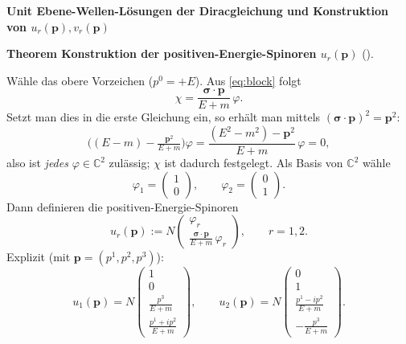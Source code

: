 \documentclass[10pt, letterpaper]{article}
\newcommand{\C}{\mathbb{C}}
\newcommand{\CustomHeading}[3]{%
  \par\medskip\noindent%
  \textbf{#1 #2} \textnormal{(#3)}.\enskip%
}
\newenvironment{THEO}[2]{\begin{unitbox}\CustomHeading{Theorem}{#1}{#2}}{\end{unitbox}}
\newenvironment{unit}[1]
  {\begin{unitbox}\textbf{Unit #1}\par\smallskip}
  {\end{unitbox}}
\begin{document}
\begin{unit}{Ebene-Wellen-Lösungen der Diracgleichung und Konstruktion von $u_r(\mathbf p),v_r(\mathbf p)$}
\begin{THEO}{Konstruktion der positiven-Energie-Spinoren $u_r(\mathbf p)$}{}
Wähle das obere Vorzeichen ($p^0=+E$). Aus \eqref{eq:block} folgt
\[
\chi=\frac{\boldsymbol{\sigma}\!\cdot\!\mathbf p}{E+m}\,\varphi.
\]
Setzt man dies in die erste Gleichung ein, so erhält man mittels $(\boldsymbol{\sigma}\!\cdot\!\mathbf p)^2=\mathbf p^2$:
\[
\big((E-m)-\tfrac{\mathbf p^2}{E+m}\big)\varphi
=\frac{(E^2-m^2)-\mathbf p^2}{E+m}\,\varphi
=0,
\]
also ist \emph{jedes} $\varphi\in\C^2$ zulässig; $\chi$ ist dadurch festgelegt.
Als Basis von $\C^2$ wähle
\[
\varphi_1=\begin{pmatrix}1\\0\end{pmatrix},\qquad
\varphi_2=\begin{pmatrix}0\\1\end{pmatrix}.
\]
Dann definieren die positiven-Energie-Spinoren
\[
u_r(\mathbf p):=N\begin{pmatrix}\varphi_r\\[2pt]
\frac{\boldsymbol{\sigma}\!\cdot\!\mathbf p}{E+m}\,\varphi_r\end{pmatrix},
\qquad r=1,2.
\]
Explizit (mit $\mathbf p=(p^1,p^2,p^3)$):
\[
u_1(\mathbf p)=N\begin{pmatrix}
1\\[2pt]0\\[2pt]\frac{p^3}{E+m}\\[2pt]\frac{p^1+ip^2}{E+m}
\end{pmatrix},\qquad
u_2(\mathbf p)=N\begin{pmatrix}
0\\[2pt]1\\[2pt]\frac{p^1-ip^2}{E+m}\\[2pt]-\frac{p^3}{E+m}
\end{pmatrix}.
\]
\end{THEO}


\end{unit}
\end{document}
